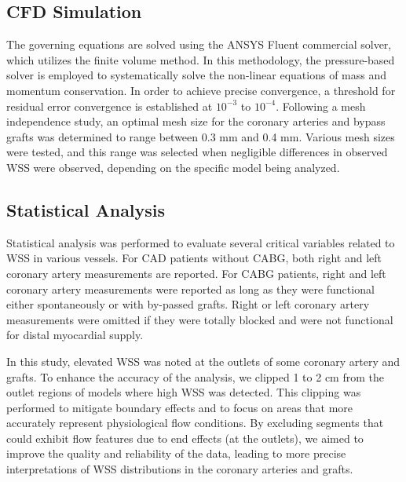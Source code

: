 ﻿\documentclass[12pt,a4paper]{article}
\theoremstyle{definition}
\numberwithin{equation}{section}
\begin{document}
\subsection{\label{CFD Simulation}CFD Simulation} 
\hspace*{\parindent}The governing equations are solved using the ANSYS Fluent commercial solver, which utilizes the finite volume method. In this methodology, the pressure-based solver is employed to systematically solve the non-linear equations of mass and momentum conservation. In order to achieve precise convergence, a threshold for residual error convergence is established at \(10^{-3}\) to \(10^{-4}\). Following a mesh independence study, an optimal mesh size for the coronary arteries and bypass grafts was determined to range between 0.3 mm and 0.4 mm. Various mesh sizes were tested, and this range was selected when negligible differences in observed WSS were observed, depending on the specific model being analyzed.

\subsection{\label{Statistical Analysis}Statistical Analysis}\hspace*{\parindent}Statistical analysis was performed to evaluate several critical variables related to WSS in various vessels. For CAD patients without CABG, both right and left coronary artery measurements are reported. For CABG patients, right and left coronary artery measurements were reported as long as they were functional either spontaneously or with by-passed grafts. Right or left coronary artery measurements were omitted if they were totally blocked and were not functional for distal myocardial supply. 

In this study, elevated WSS was noted at the outlets of some coronary artery and grafts. To enhance the accuracy of the analysis, we clipped 1 to 2 cm from the outlet regions of models where high WSS was detected. This clipping was performed to mitigate boundary effects and to focus on areas that more accurately represent physiological flow conditions. By excluding segments that could exhibit flow features due to end effects (at the outlets), we aimed to improve the quality and reliability of the data, leading to more precise interpretations of WSS distributions in the coronary arteries and grafts. 
\end{document}
